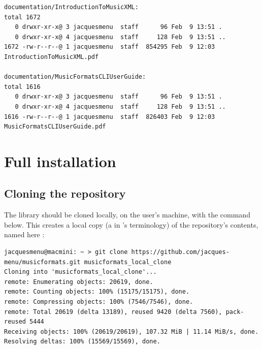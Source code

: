 \begin{lstlisting}[language=Terminal]
documentation/IntroductionToMusicXML:
total 1672
   0 drwxr-xr-x@ 3 jacquesmenu  staff      96 Feb  9 13:51 .
   0 drwxr-xr-x@ 4 jacquesmenu  staff     128 Feb  9 13:51 ..
1672 -rw-r--r--@ 1 jacquesmenu  staff  854295 Feb  9 12:03 IntroductionToMusicXML.pdf

documentation/MusicFormatsCLIUserGuide:
total 1616
   0 drwxr-xr-x@ 3 jacquesmenu  staff      96 Feb  9 13:51 .
   0 drwxr-xr-x@ 4 jacquesmenu  staff     128 Feb  9 13:51 ..
1616 -rw-r--r--@ 1 jacquesmenu  staff  826403 Feb  9 12:03 MusicFormatsCLIUserGuide.pdf
\end{lstlisting}


\chapter{Full installation}

\section{Cloning the repository}

The library should be cloned locally, on the user's machine, with the command below. This creates a local copy (a  in \git's terminology) of the repository's contents, named here :
\begin{lstlisting}[language=Terminal]
jacquesmenu@macmini: ~ > git clone https://github.com/jacques-menu/musicformats.git musicformats_local_clone
Cloning into 'musicformats_local_clone'...
remote: Enumerating objects: 20619, done.
remote: Counting objects: 100% (15175/15175), done.
remote: Compressing objects: 100% (7546/7546), done.
remote: Total 20619 (delta 13189), reused 9420 (delta 7560), pack-reused 5444
Receiving objects: 100% (20619/20619), 107.32 MiB | 11.14 MiB/s, done.
Resolving deltas: 100% (15569/15569), done.
\end{lstlisting}

